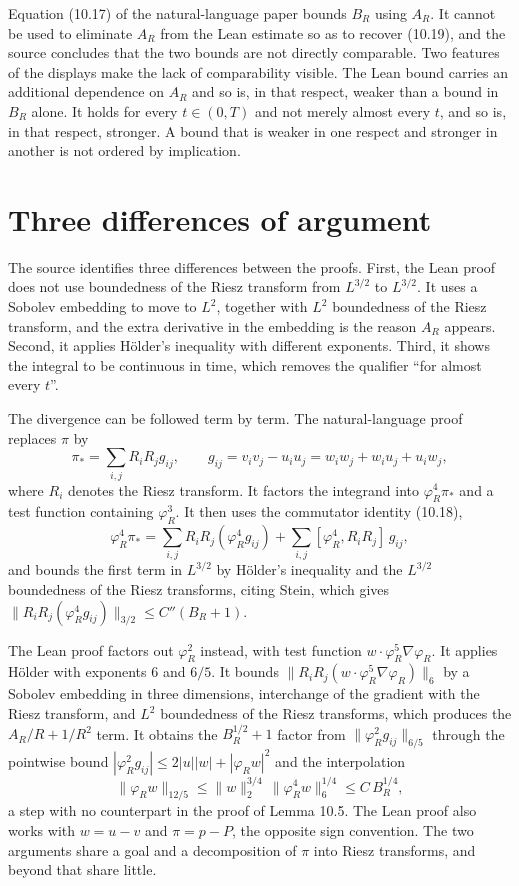 Equation (10.17) of the natural-language paper bounds $B_R$ using $A_R$. It cannot be used to eliminate $A_R$ from the Lean estimate so as to recover (10.19), and the source concludes that the two bounds are not directly comparable. Two features of the displays make the lack of comparability visible. The Lean bound carries an additional dependence on $A_R$ and so is, in that respect, weaker than a bound in $B_R$ alone. It holds for every $t \in (0,T)$ and not merely almost every $t$, and so is, in that respect, stronger. A bound that is weaker in one respect and stronger in another is not ordered by implication.

\section{Three differences of argument}

The source identifies three differences between the proofs. First, the Lean proof does not use boundedness of the Riesz transform from $L^{3/2}$ to $L^{3/2}$. It uses a Sobolev embedding to move to $L^2$, together with $L^2$ boundedness of the Riesz transform, and the extra derivative in the embedding is the reason $A_R$ appears. Second, it applies H\"older's inequality with different exponents. Third, it shows the integral to be continuous in time, which removes the qualifier ``for almost every $t$''.

The divergence can be followed term by term. The natural-language proof replaces $\pi$ by
\[
\pi_* = \sum_{i,j} R_i R_j g_{ij}, \qquad g_{ij} = v_i v_j - u_i u_j = w_i w_j + w_i u_j + u_i w_j,
\]
where $R_i$ denotes the Riesz transform. It factors the integrand into $\varphi_R^4 \pi_*$ and a test function containing $\varphi_R^3$. It then uses the commutator identity (10.18),
\[
\varphi_R^4 \pi_* = \sum_{i,j} R_i R_j(\varphi_R^4 g_{ij}) + \sum_{i,j} [\varphi_R^4, R_i R_j]\, g_{ij},
\]
and bounds the first term in $L^{3/2}$ by H\"older's inequality and the $L^{3/2}$ boundedness of the Riesz transforms, citing Stein, which gives $\|R_i R_j(\varphi_R^4 g_{ij})\|_{3/2} \le C''(B_R + 1)$.

The Lean proof factors out $\varphi_R^2$ instead, with test function $w \cdot \varphi_R^5 \nabla \varphi_R$. It applies H\"older with exponents $6$ and $6/5$. It bounds $\|R_i R_j(w \cdot \varphi_R^5 \nabla \varphi_R)\|_6$ by a Sobolev embedding in three dimensions, interchange of the gradient with the Riesz transform, and $L^2$ boundedness of the Riesz transforms, which produces the $A_R/R + 1/R^2$ term. It obtains the $B_R^{1/2} + 1$ factor from $\|\varphi_R^2 g_{ij}\|_{6/5}$ through the pointwise bound $|\varphi_R^2 g_{ij}| \le 2|u||w| + |\varphi_R w|^2$ and the interpolation
\[
\|\varphi_R w\|_{12/5} \le \|w\|_2^{3/4}\, \|\varphi_R^4 w\|_6^{1/4} \le C\, B_R^{1/4},
\]
a step with no counterpart in the proof of Lemma 10.5. The Lean proof also works with $w = u - v$ and $\pi = p - P$, the opposite sign convention. The two arguments share a goal and a decomposition of $\pi$ into Riesz transforms, and beyond that share little.

